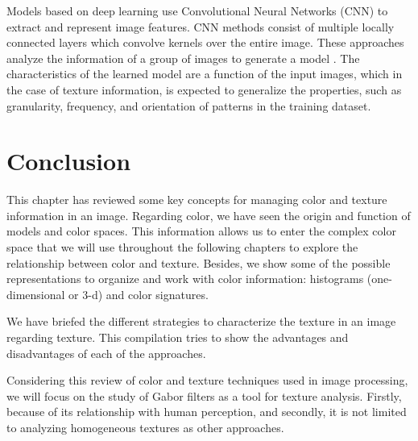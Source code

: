 Models based on deep learning use Convolutional Neural Networks (CNN) to extract and represent image features. CNN methods consist of multiple locally connected layers which convolve kernels over the entire image. These approaches analyze the information of a group of images to generate a model \citep{Lin.Maji:CVPR:2016}. The characteristics of the learned model are a function of the input images, which in the case of texture information, is expected to generalize the properties, such as granularity, frequency, and orientation of patterns in the training dataset.

\section{Conclusion}

This chapter has reviewed some key concepts for managing color and texture information in an image. Regarding color, we have seen the origin and function of models and color spaces. This information allows us to enter the complex color space that we will use throughout the following chapters to explore the relationship between color and texture. Besides, we show some of the possible representations to organize and work with color information: histograms (one-dimensional or 3-d) and color signatures.

We have briefed the different strategies to characterize the texture in an image regarding texture. This compilation tries to show the advantages and disadvantages of each of the approaches.

Considering this review of color and texture techniques used in image processing, we will focus on the study of Gabor filters as a tool for texture analysis. Firstly, because of its relationship with human perception, and secondly, it is not limited to analyzing homogeneous textures as other approaches.